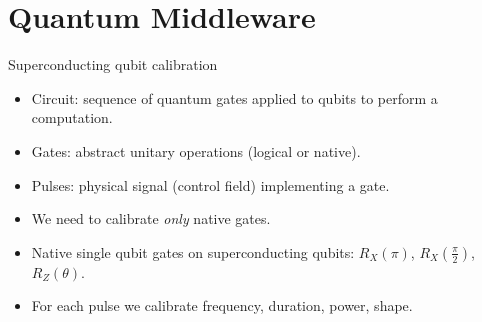 \documentclass[aspectratio=169,10pt]{beamer}
\begin{document}
\section{Quantum Middleware}

\begin{frame}{Superconducting qubit calibration}
  \begin{itemize}
    \item<1-> Circuit: sequence of quantum gates applied to qubits to perform a computation.
    \item<2-> Gates: abstract unitary operations (logical or native).
    \item<3-> Pulses: physical signal (control field) implementing a gate.
  \end{itemize}
\vspace{0.75em}
  \vspace{0.75em}
  \begin{itemize}
    \item<2-> We need to calibrate \textit{only} native gates.
    \item<2-> Native single qubit gates on superconducting qubits: $R_X(\pi)$, $R_X(\frac{\pi}{2})$, $R_Z(\theta)$.
    \item<3-> For each pulse we calibrate frequency, duration, power, shape.
  \end{itemize}
\end{frame}
\end{document}
